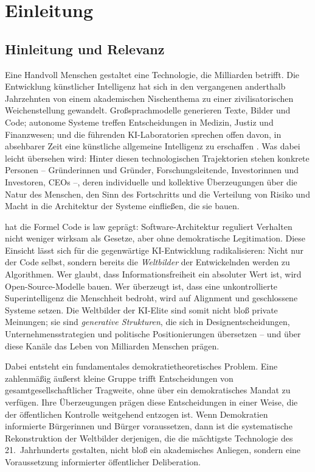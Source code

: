 \documentclass[12pt,a4paper]{article}
\begin{document}
\section{Einleitung}
\label{sec:einleitung}

\subsection{Hinleitung und Relevanz}
\label{sec:einleitung:relevanz}

Eine Handvoll Menschen gestaltet eine Technologie, die Milliarden betrifft. Die Entwicklung k\"unstlicher Intelligenz hat sich in den vergangenen anderthalb Jahrzehnten von einem akademischen Nischenthema zu einer zivilisatorischen Weichenstellung gewandelt. Gro\ss{}sprachmodelle generieren Texte, Bilder und Code; autonome Systeme treffen Entscheidungen in Medizin, Justiz und Finanzwesen; und die f\"uhrenden KI-Laboratorien sprechen offen davon, in absehbarer Zeit eine k\"unstliche allgemeine Intelligenz zu erschaffen \citep{Bubeck2023, Bengio2024}. Was dabei leicht \"ubersehen wird: Hinter diesen technologischen Trajektorien stehen konkrete Personen -- Gr\"underinnen und Gr\"under, Forschungsleitende, Investorinnen und Investoren, CEOs --, deren individuelle und kollektive \"Uberzeugungen \"uber die Natur des Menschen, den Sinn des Fortschritts und die Verteilung von Risiko und Macht in die Architektur der Systeme einflie\ss{}en, die sie bauen.

\citet{Lessig1999} hat die Formel \glqq Code is law\grqq{} gepr\"agt: Software-Architektur reguliert Verhalten nicht weniger wirksam als Gesetze, aber ohne demokratische Legitimation. Diese Einsicht l\"asst sich f\"ur die gegenw\"artige KI-Entwicklung radikalisieren: Nicht nur der Code selbst, sondern bereits die \emph{Weltbilder} der Entwickelnden werden zu Algorithmen. Wer glaubt, dass Informationsfreiheit ein absoluter Wert ist, wird Open-Source-Modelle bauen. Wer \"uberzeugt ist, dass eine unkontrollierte Superintelligenz die Menschheit bedroht, wird auf Alignment und geschlossene Systeme setzen. Die Weltbilder der KI-Elite sind somit nicht blo\ss{} private Meinungen; sie sind \emph{generative Strukturen}, die sich in Designentscheidungen, Unternehmensstrategien und politische Positionierungen \"ubersetzen -- und \"uber diese Kan\"ale das Leben von Milliarden Menschen pr\"agen.

Dabei entsteht ein fundamentales demokratietheoretisches Problem. Eine zahlenm\"a\ss{}ig \"au\ss{}erst kleine Gruppe trifft Entscheidungen von gesamtgesellschaftlicher Tragweite, ohne \"uber ein demokratisches Mandat zu verf\"ugen. Ihre \"Uberzeugungen pr\"agen diese Entscheidungen in einer Weise, die der \"offentlichen Kontrolle weitgehend entzogen ist. Wenn Demokratien informierte B\"urgerinnen und B\"urger voraussetzen, dann ist die systematische Rekonstruktion der Weltbilder derjenigen, die die m\"achtigste Technologie des 21.~Jahrhunderts gestalten, nicht blo\ss{} ein akademisches Anliegen, sondern eine Voraussetzung informierter \"offentlicher Deliberation.
\end{document}
